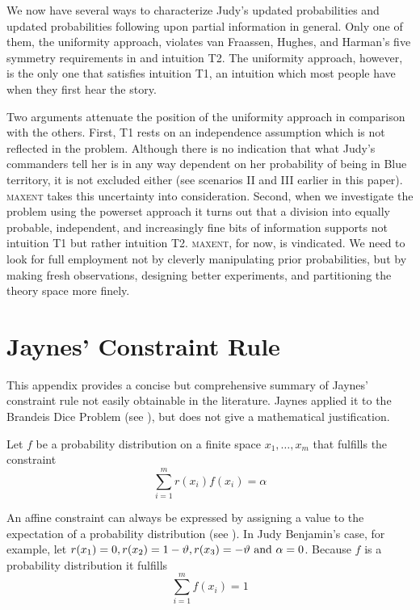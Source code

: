 \documentclass[12pt]{article}
\begin{document}
We now have several ways to characterize Judy's updated
probabilities and updated probabilities following upon partial
information in general. Only one of them, the uniformity approach,
violates van Fraassen, Hughes, and Harman's five symmetry requirements
in  and intuition T2. The uniformity
approach, however, is the only one that satisfies intuition T1, an
intuition which most people have when they first hear the story. 

Two arguments attenuate the position of the uniformity approach in
comparison with the others. First, T1 rests on an independence
assumption which is not reflected in the problem. Although there is no
indication that what Judy's commanders tell her is in any way
dependent on her probability of being in Blue territory, it is not
excluded either (see scenarios II and III earlier in this paper).
\textsc{maxent} takes this uncertainty into consideration. Second,
when we investigate the problem using the powerset approach it turns
out that a division into equally probable, independent, and
increasingly fine bits of information supports not intuition T1 but
rather intuition T2. \textsc{maxent}, for now, is vindicated. We need
to look for full employment not by cleverly manipulating prior
probabilities, but by making fresh observations, designing better
experiments, and partitioning the theory space more finely.

\appendix

\section{Jaynes' Constraint Rule}
\label{JaynesConstraintRule}

This appendix provides a concise but comprehensive summary of
Jaynes' constraint rule not easily obtainable in the literature.
Jaynes applied it to the Brandeis Dice Problem (see
), but does not give a mathematical
justification.

Let $f$ be a probability distribution on a finite space
$x_{1},\ldots,x_{m}$ that fulfills the constraint 
\begin{equation}
  \label{eq:constraint}
\sum_{i=1}^{m}r(x_{i})f(x_{i})=\alpha
\end{equation}

An affine constraint can always be expressed by assigning a value to
the expectation of a probability distribution (see
). In Judy Benjamin's case, for example, let
$r(x_{1})=0, r(x_{2})=1-{\vartheta}, r(x_{3})=-{\vartheta}\mbox{ and }\alpha=0$. Because $f$
is a probability distribution it fulfills
\begin{equation}
  \label{eq:unity}
\sum_{i=1}^{m}f(x_{i})=1
\end{equation}
\end{document}

